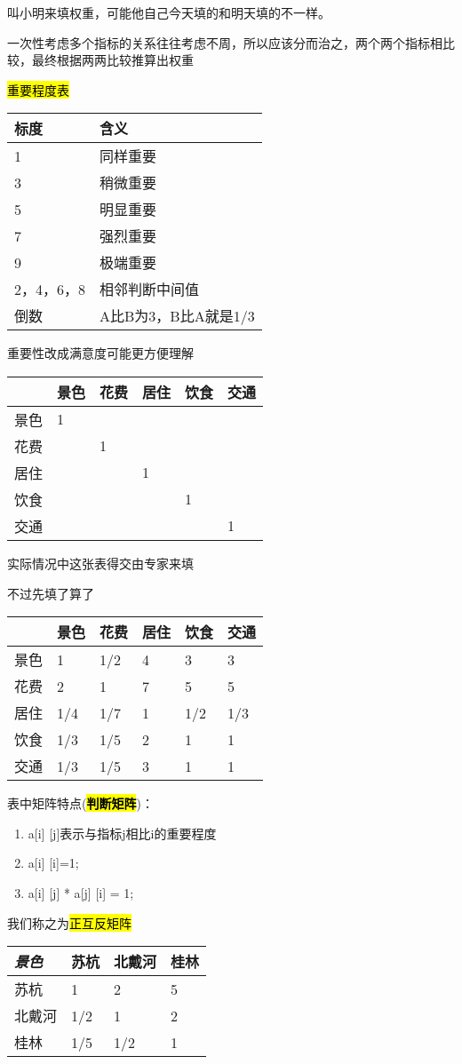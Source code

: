 \documentclass[
]{article}
\begin{document}
叫小明来填权重，可能他自己今天填的和明天填的不一样。

一次性考虑多个指标的关系往往考虑不周，所以应该分而治之，两个两个指标相比较，最终根据两两比较推算出权重

\hl{重要程度表}

\begin{longtable}[]{@{}ll@{}}
\toprule
标度 & 含义\tabularnewline
\midrule
\endhead
1 & 同样重要\tabularnewline
3 & 稍微重要\tabularnewline
5 & 明显重要\tabularnewline
7 & 强烈重要\tabularnewline
9 & 极端重要\tabularnewline
2，4，6，8 & 相邻判断中间值\tabularnewline
倒数 & A比B为3，B比A就是1/3\tabularnewline
\bottomrule
\end{longtable}

重要性改成满意度可能更方便理解

\begin{longtable}[]{@{}llllll@{}}
\toprule
& 景色 & 花费 & 居住 & 饮食 & 交通\tabularnewline
\midrule
\endhead
景色 & 1 & & & &\tabularnewline
花费 & & 1 & & &\tabularnewline
居住 & & & 1 & &\tabularnewline
饮食 & & & & 1 &\tabularnewline
交通 & & & & & 1\tabularnewline
\bottomrule
\end{longtable}

实际情况中这张表得交由专家来填

不过先填了算了

\begin{longtable}[]{@{}llllll@{}}
\toprule
& 景色 & 花费 & 居住 & 饮食 & 交通\tabularnewline
\midrule
\endhead
景色 & 1 & 1/2 & 4 & 3 & 3\tabularnewline
花费 & 2 & 1 & 7 & 5 & 5\tabularnewline
居住 & 1/4 & 1/7 & 1 & 1/2 & 1/3\tabularnewline
饮食 & 1/3 & 1/5 & 2 & 1 & 1\tabularnewline
交通 & 1/3 & 1/5 & 3 & 1 & 1\tabularnewline
\bottomrule
\end{longtable}

表中矩阵特点(\hl{\textbf{判断矩阵}})：

\begin{enumerate}
\def\labelenumi{\arabic{enumi}.}
\item
  a{[}i{]} {[}j{]}表示与指标j相比i的重要程度
\item
  a{[}i{]} {[}i{]}=1;
\item
  a{[}i{]} {[}j{]} * a{[}j{]} {[}i{]} = 1;
\end{enumerate}

我们称之为\hl{正互反矩阵}

\begin{longtable}[]{@{}llll@{}}
\toprule
\textbf{\emph{景色}} & 苏杭 & 北戴河 & 桂林\tabularnewline
\midrule
\endhead
苏杭 & 1 & 2 & 5\tabularnewline
北戴河 & 1/2 & 1 & 2\tabularnewline
桂林 & 1/5 & 1/2 & 1\tabularnewline
\bottomrule
\end{longtable}
\end{document}
